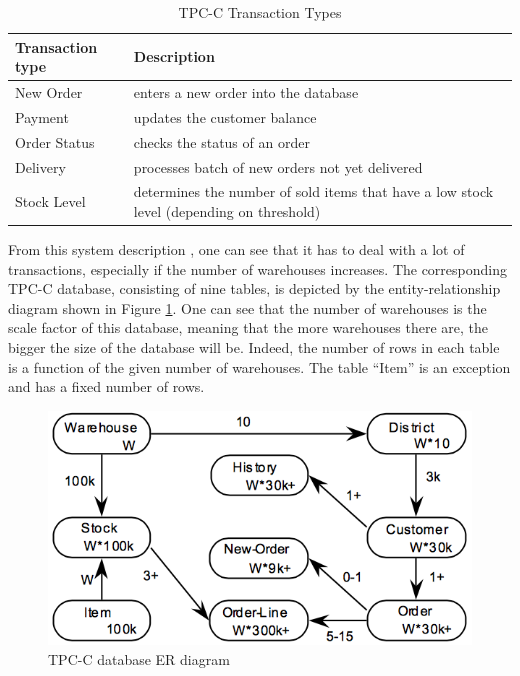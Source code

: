\begin{table}[h]
	\centering
	\begin{tabular}{|m{4cm}|m{9cm}|}
		\hline
		\textbf{Transaction type} & \textbf{Description}\\
		\hline
		New Order & enters a new order into the database\\
		\hline
		Payment & updates the customer balance\\
		\hline
		Order Status & checks the status of an order\\
		\hline
		Delivery & processes batch of new orders not yet delivered\\
		\hline
		Stock Level & determines the number of sold items that have a low stock level (depending on threshold)\\
		\hline
	\end{tabular}
	\caption{TPC-C Transaction Types}
	\label{table:tpcc_trans_type_list}
\end{table}

From this system description \cite{tpcc10}, one can see that it has to deal with a lot of transactions, especially if the number of warehouses increases.
The corresponding TPC-C database, consisting of nine tables, is depicted by the entity-relationship diagram shown in Figure \ref{fig:tpcc_erd}.
One can see that the number of warehouses is the scale factor of this database, meaning that the more warehouses there are, the bigger the size of the database will be.
Indeed, the number of rows in each table is a function of the given number of warehouses.
The table ``Item'' is an exception and has a fixed number of rows.

\begin{figure}[h]
	\centering
	\includegraphics[scale=0.5]{figures/tpcc_erd.png}
	\caption{TPC-C database ER diagram \cite[p. 11]{tpcc10}}
	\label{fig:tpcc_erd}
\end{figure}

